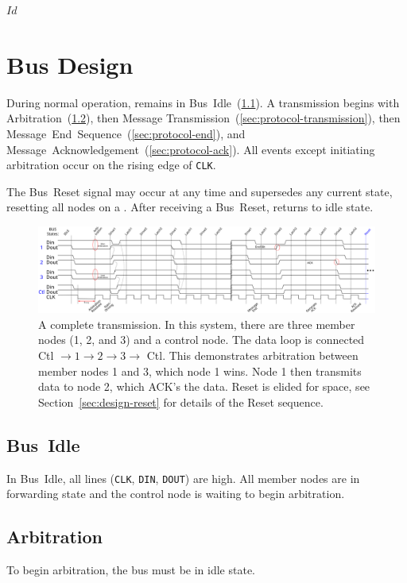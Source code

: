 \svnInfo $Id$

\section{Bus Design}
\label{sec:protocol}
During normal operation, \bus remains in Bus~Idle~(\ref{sec:protocol-idle}).
A transmission begins with Arbitration~(\ref{sec:protocol-arbitration}), then
Message Transmission~(\ref{sec:protocol-transmission}), then
Message~End~Sequence~(\ref{sec:protocol-end}),
and Message~Acknowledgement~(\ref{sec:protocol-ack}).
All events except initiating arbitration occur on the rising
edge of {\tt CLK}.

The Bus~Reset signal may occur at any time and supersedes any current state,
resetting all nodes on a \bus. After receiving a Bus~Reset, \bus returns to
{\sc idle} state.

\begin{figure}[h!]
\includegraphics[width=\linewidth]{img/timing}
\caption{A complete transmission. In this system, there are
three member nodes (1, 2, and 3) and a control node. The data loop is connected
Ctl $\rightarrow 1 \rightarrow 2 \rightarrow 3 \rightarrow$ Ctl. This
demonstrates arbitration between member nodes 1 and 3, which node 1 wins. Node
1 then transmits data to node 2, which ACK's the data. Reset is elided for
space, see Section~\ref{sec:design-reset} for details of the Reset sequence.
}
\label{fig:transmission}
\end{figure}

\subsection{Bus~Idle}
\label{sec:protocol-idle}
In \bus Bus~Idle, all lines ({\tt CLK}, {\tt DIN}, {\tt DOUT}) are high.
All member nodes are in forwarding state and the control node is waiting to
begin arbitration.

\subsection{Arbitration}
\label{sec:protocol-arbitration}
To begin arbitration, the bus must be in idle state.

